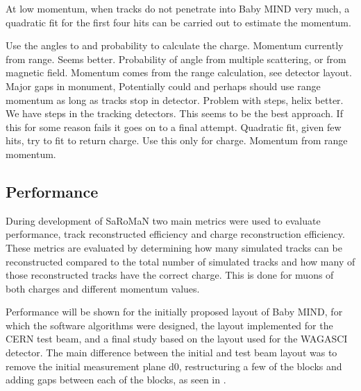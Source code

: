 

At low momentum, when tracks do not penetrate into Baby MIND very much, a quadratic fit for the first four hits can be carried out to estimate the momentum.

Use the angles to and probability to calculate the charge. Momentum currently from range. Seems better.
Probability of angle from multiple scattering, or from magnetic field. 
Momentum comes from the range calculation, see detector layout. Major gaps in monument,  Potentially could and perhaps should use range momentum as long as tracks stop in detector. Problem with steps, helix better.
We have steps in the tracking detectors.
This seems to be the best approach. If this for some reason fails it goes on to a final attempt.
Quadratic fit, given few hits, try to fit to return charge. Use this only for charge. Momentum from range momentum.
\fi

\subsection{Performance}


During development of SaRoMaN two main metrics were used to evaluate performance, track reconstructed efficiency and charge reconstruction efficiency. These metrics are evaluated by determining how many simulated tracks can be reconstructed compared to the total number of simulated tracks and how many of those reconstructed tracks have the correct charge. This is done for muons of both charges and different momentum values.

Performance will be shown for the initially proposed layout of Baby MIND, for which the software algorithms were designed, the layout implemented for the CERN test beam, and a final study based on the layout used for the WAGASCI detector. The main difference between the initial and test beam layout was to remove the initial measurement plane d0, restructuring a few of the blocks and adding gaps between each of the blocks, as seen in . %

